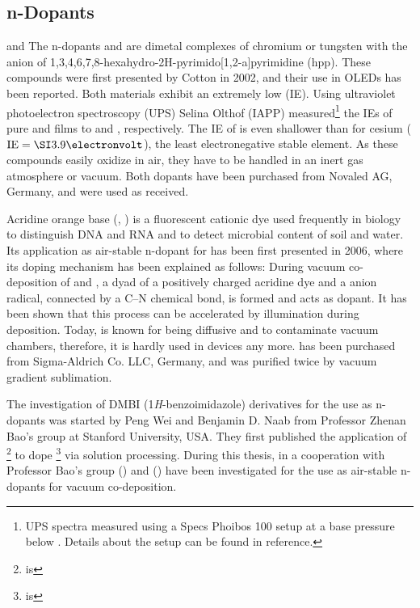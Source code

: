 \subsection{n-Dopants}\label{sec:Matn}
%
\minisec
{\boldmath \CrPd and \WPd}
The n-dopants \CrPd and \WPd are dimetal complexes of chromium or tungsten with the anion of 1,3,4,6,7,8-hexahydro-2H-pyrimido[1,2-a]pyrimidine (hpp). These compounds were first presented by Cotton\etal\cite{Cotton2002,Cotton2005} in 2002, and their use in OLEDs has been reported\cite{PatentWerner2005, WellmannDiss}.
%
Both materials exhibit an extremely low \IE (IE). Using ultraviolet photoelectron spectroscopy (UPS) Selina Olthof (IAPP) measured\footnote{UPS spectra measured using a Specs Phoibos 100 setup at a base pressure below . Details about the setup can be found in reference\cite{SelinaOlthofDiss}.}
the IEs of pure \CrPd and \WPd films to  and , respectively\cite{Menke2012}. The IE of \WPd is even shallower than for cesium (\mbox{$\text{IE}=\eV{3.9}$}), the least electronegative stable element. %
As these compounds easily oxidize in air, they have to be handled in an inert gas atmosphere or vacuum.
Both dopants have been purchased from Novaled AG, Germany, and were used as received.

\minisec{\aob}
Acridine orange base (\aob, \aobLong) is a fluorescent cationic dye used frequently in biology to distinguish DNA and RNA and to detect microbial content of soil and water.
Its application as air-stable n-dopant for \CS has been first presented in 2006\cite{Li2006}, where its doping mechanism has been explained as follows: During vacuum co-deposition of \aob and \CS, a dyad of a positively charged acridine dye and a \CS anion radical, connected by a C--N chemical bond, is formed and acts as dopant. It has been shown that this process can be accelerated by illumination during deposition.
Today, \aob is known for being diffusive and to contaminate vacuum chambers, therefore, it is hardly used in devices any more.
%
\aob has been purchased from Sigma-Aldrich Co. LLC, Germany, and was purified twice by vacuum gradient sublimation.

The investigation of DMBI (1\textsl{H}-benzoimidazole) derivatives for the use as n-dopants was started by Peng Wei and Benjamin D. Naab from Professor Zhenan Bao's group at Stanford University, USA. They first published the application of \Ndmbi\footnote{\Ndmbi is \NdmbiLong} to dope \PCBM\footnote{\PCBM is \PCBMLong} via solution processing\cite{Wei2010}. During this thesis, in a cooperation with Professor Bao's group \dmbiPOH (\dmbiPOHLong) and \meodmbiI (\meodmbiILong) have been investigated for the use as air-stable n-dopants for vacuum co-deposition.

